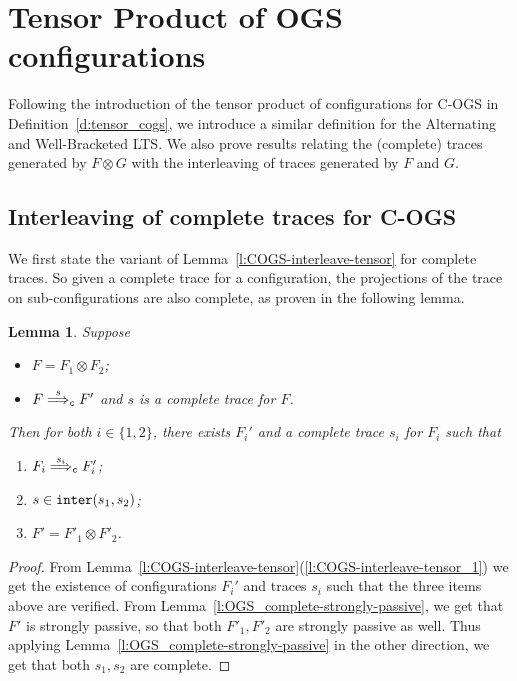 \documentclass[11pt,a4paper]{amsart}
\theoremstyle{plain}
\theoremstyle{definition}
\theoremstyle{defC}
\theoremstyle{thmC}
\theoremstyle{plain}
\numberwithin{equation}{section}
\newcommand{\tr}{s}
\newcommand{\COGS}{\mbox{{\rm C-OGS}}\xspace}      %
\newcommand{\appendCon}[2]{#1 \otimes #2}
\newcommand{\rmm}[1]{{\tt{\lowercase{#1}}}}
\newcommand{\genArr}[2]{\mathrel{\stackrel{{#1}}{\Longrightarrow}_{\rmm{\lowercase{#2}}}}}  %
\newcommand{\ArrC}[1]{\genArr{#1}{C}}   %
\newcommand{\interl}[2]{{\tt inter}( #1, #2)}
\newcommand{\FF}{F}
\newcommand{\GG}{G}
\theoremstyle{plain}
\newtheorem{lemma}[thm]{Lemma}
\theoremstyle{definition}
\begin{document}
\section{Tensor Product of OGS configurations}
\label{sec:tensor}

Following the introduction of the tensor product of configurations
for C-OGS in Definition~\ref{d:tensor_cogs}, we 
introduce a similar definition for the Alternating and Well-Bracketed LTS.
We also prove results relating the 
(complete) traces generated by $\FF \otimes \GG$
with the interleaving of traces generated by $\FF$ and $\GG$.


\subsection{Interleaving of complete traces for \COGS}

We first state the variant of Lemma~\ref{l:COGS-interleave-tensor}
for complete traces.
So given a complete trace for a configuration, the projections of the
trace on sub-configurations are also complete, as proven in the following lemma.


\begin{lemma}
  \label{l:COGS-decomp-ct}
  Suppose 
  \begin{itemize}
  \item $\FF = \appendCon{\FF_1}{\FF_2}$;
  \item $\FF \ArrC \tr \FF'$ and $ \tr $ is a complete trace
  for $\FF$.
  \end{itemize} 
  Then for both $i \in \{1,2\}$,
  there exists $\FF_i'$ and a complete trace $\tr_i$
  for $\FF_i$ such that
  \begin{enumerate}
  \item ${\FF_i} \ArrC{\tr_i} \FF_i'$;
  \item $\tr \in \interl{\tr_1}{\tr_2}$;
  \item $\FF' = \appendCon{\FF'_1} {\FF'_2}$.
  \end{enumerate}
\end{lemma}              
  
\begin{proof}
  From Lemma~\ref{l:COGS-interleave-tensor}(\ref{l:COGS-interleave-tensor_1}) 
  we get the existence of configurations $\FF_i'$ and traces $\tr_i$ 
  such that the three items above are verified.
  From Lemma~\ref{l:OGS_complete-strongly-passive}, we get that $\FF'$
  is strongly passive, so that both $\FF'_1,\FF'_2$ are strongly passive as well.
  Thus applying Lemma~\ref{l:OGS_complete-strongly-passive}
  in the other direction,
  we get that both $\tr_1,\tr_2$ are complete.
\end{proof} 
\end{document}
